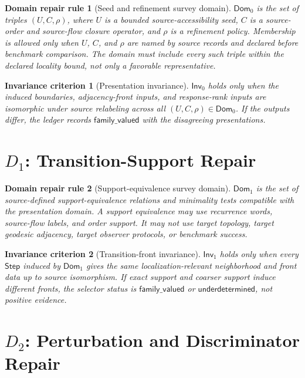 \documentclass[11pt]{article}
\newcommand{\Step}{\mathsf{Step}}
\newcommand{\Dom}{\mathsf{Dom}}
\newcommand{\Inv}{\mathsf{Inv}}
\newtheorem{domainrule}{Domain repair rule}
\newtheorem{criterion}{Invariance criterion}
\begin{document}
\begin{domainrule}[Seed and refinement survey domain]
\(\Dom_0\) is the set of triples \((U,C,\rho)\), where \(U\) is a bounded
source-accessibility seed, \(C\) is a source-order and source-flow closure
operator, and \(\rho\) is a refinement policy. Membership is allowed only
when \(U\), \(C\), and \(\rho\) are named by source records and declared
before benchmark comparison. The domain must include every such triple within
the declared locality bound, not only a favorable representative.
\end{domainrule}

\begin{criterion}[Presentation invariance]
\(\Inv_0\) holds only when the induced boundaries, adjacency-front inputs,
and response-rank inputs are isomorphic under source relabeling across all
\((U,C,\rho)\in\Dom_0\). If the outputs differ, the ledger records
\(\mathsf{family\_valued}\) with the disagreeing presentations.
\end{criterion}

\section{\texorpdfstring{\(D_1\)}{D1}: Transition-Support Repair}

\begin{domainrule}[Support-equivalence survey domain]
\(\Dom_1\) is the set of source-defined support-equivalence relations and
minimality tests compatible with the presentation domain. A support
equivalence may use recurrence words, source-flow labels, and order support.
It may not use target topology, target geodesic adjacency, target observer
protocols, or benchmark success.
\end{domainrule}

\begin{criterion}[Transition-front invariance]
\(\Inv_1\) holds only when every \(\Step\) induced by \(\Dom_1\) gives the
same localization-relevant neighborhood and front data up to source
isomorphism. If exact support and coarser support induce different fronts,
the selector status is \(\mathsf{family\_valued}\) or
\(\mathsf{underdetermined}\), not positive evidence.
\end{criterion}

\section{\texorpdfstring{\(D_2\)}{D2}: Perturbation and Discriminator Repair}
\end{document}
